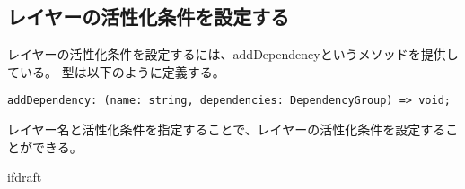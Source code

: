 \documentclass{jsarticle}
\begin{document}
\subsection{レイヤーの活性化条件を設定する}
レイヤーの活性化条件を設定するには、addDependencyというメソッドを提供している。
型は以下のように定義する。
\begin{lstlisting}[caption=addDependencyの型]
addDependency: (name: string, dependencies: DependencyGroup) => void;
\end{lstlisting}
レイヤー名と活性化条件を指定することで、レイヤーの活性化条件を設定することができる。

\expandafter\ifx\csname ifdraft\endcsname\relax
\end{document}
